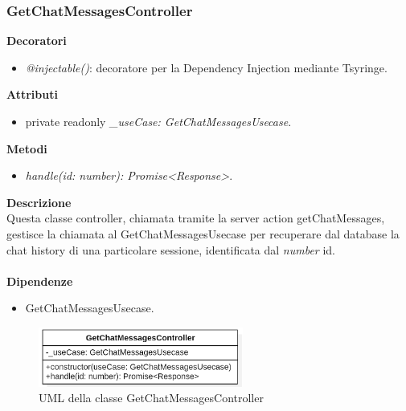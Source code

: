 \subsubsection{GetChatMessagesController}
\textbf{Decoratori}
\begin{itemize}
    \item \textit{@injectable()}: decoratore per la Dependency Injection mediante Tsyringe.
\end{itemize}
\textbf{Attributi}
\begin{itemize}
    \item private readonly \textit{\_useCase: GetChatMessagesUsecase}.
\end{itemize}
\textbf{Metodi}
\begin{itemize}
    \item \textit{handle(id: number): Promise<Response>}.
\end{itemize}
\textbf{Descrizione}\\
Questa classe controller, chiamata tramite la server action getChatMessages, gestisce la chiamata al GetChatMessagesUsecase per recuperare dal database la chat history di una particolare sessione, identificata dal \textit{number} id.\\ \\
\textbf{Dipendenze}
\begin{itemize}
    \item GetChatMessagesUsecase.
\end{itemize}

\begin{figure}[h!]
    \centering  
    \includegraphics[width=0.6\textwidth]{GetChatMessagesController.png}
    \caption{UML della classe GetChatMessagesController}
\end{figure}

